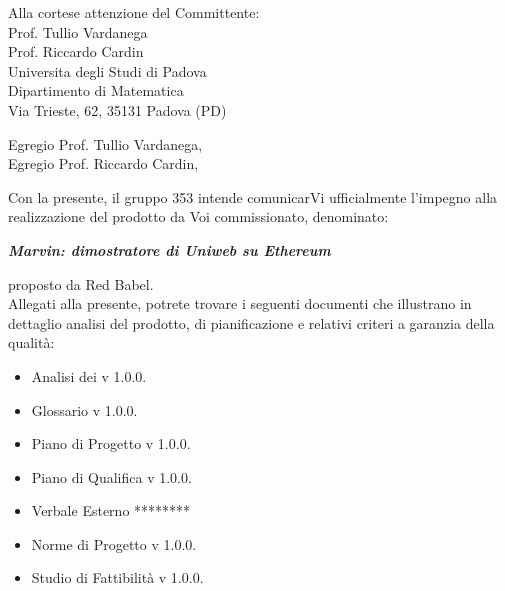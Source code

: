 \documentclass[openany, a4paper, 12pt]{letter}
\begin{document}
	
	\begin{letter}{
			Alla cortese attenzione del Committente:\\
			\smallskip
			Prof. Tullio Vardanega\\
			Prof. Riccardo Cardin\\
			\medskip
			Universita degli Studi di Padova \\
			Dipartimento di Matematica\\
			Via Trieste, 62, 35131 Padova (PD)}
			\opening{Egregio Prof. Tullio Vardanega, \\
				Egregio Prof. Riccardo Cardin,}
			Con la presente, il gruppo 353 intende comunicarVi ufficialmente l’impegno alla realizzazione del
			prodotto da Voi commissionato, denominato: \\
			\begin{center}
			\emph{\textbf{Marvin: dimostratore di Uniweb su Ethereum}}\medskip \\
			\end{center}
			proposto da Red Babel.\medskip\\
			Allegati alla presente, potrete trovare i seguenti documenti che illustrano in dettaglio analisi del
			prodotto, di pianificazione e relativi criteri a garanzia della qualità: 
			\begin{itemize}
				\item Analisi dei  v 1.0.0.
				\item Glossario v 1.0.0.
				\item Piano di Progetto v 1.0.0.
				\item Piano di Qualifica v 1.0.0.
				\item Verbale Esterno ********%
				\item Norme di Progetto v 1.0.0.
				\item Studio di Fattibilità v 1.0.0.
				\end{itemize}
			
			\thispagestyle{firstpage}
			\newpage
			

\end{letter}
\end{document}
